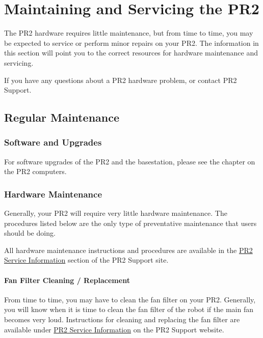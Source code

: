 \chapter{Maintaining and Servicing the PR2}

The PR2 hardware requires little maintenance, but from time to time, you may be expected to service or perform minor repairs on your PR2. The information in this section will point you to the correct resources for hardware maintenance and servicing.

If you have any questions about a PR2 hardware problem, or contact PR2 Support.

\section{Regular Maintenance}

\subsection{Software and Upgrades}

For software upgrades of the PR2 and the basestation, please see the chapter on the PR2 computers.

\subsection{Hardware Maintenance}

Generally, your PR2 will require very little hardware maintenance. The procedures listed below are the only type of preventative maintenance that users should be doing. 

All hardware maintenance instructions and procedures are available in the \href{http://pr2support.willowgarage.com/wiki/PR2 Service Information}{PR2 Service Information} section of the PR2 Support site. 

\subsubsection{Fan Filter Cleaning / Replacement}

From time to time, you may have to clean the fan filter on your PR2. Generally, you will know when it is time to clean the fan filter of the robot if the main fan becomes very loud. Instructions for cleaning and replacing the fan filter are available under \href{http://pr2support.willowgarage.com/wiki/PR2 Service Information}{PR2 Service Information} on the PR2 Support website.

